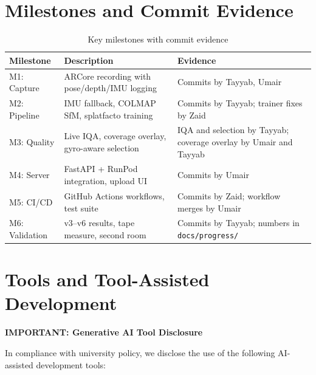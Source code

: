 \section{Milestones and Commit Evidence}

\begin{table}[htbp]
\centering
\small
\caption{Key milestones with commit evidence}
\label{tab:milestones}
\begin{tabular}{p{2.5cm}p{5cm}p{4cm}}
\toprule
\textbf{Milestone} & \textbf{Description} & \textbf{Evidence} \\
\midrule
M1: Capture & ARCore recording with pose/depth/IMU logging & Commits by Tayyab, Umair \\
M2: Pipeline & IMU fallback, COLMAP SfM, splatfacto training & Commits by Tayyab; trainer fixes by Zaid \\
M3: Quality & Live IQA, coverage overlay, gyro-aware selection & IQA and selection by Tayyab; coverage overlay by Umair and Tayyab \\
M4: Server & FastAPI + RunPod integration, upload UI & Commits by Umair \\
M5: CI/CD & GitHub Actions workflows, test suite & Commits by Zaid; workflow merges by Umair \\
M6: Validation & v3--v6 results, tape measure, second room & Commits by Tayyab; numbers in \texttt{docs/progress/} \\
\bottomrule
\end{tabular}
\end{table}

\section{Tools and Tool-Assisted Development}

\textbf{IMPORTANT: Generative AI Tool Disclosure}

In compliance with university policy, we disclose the use of the following AI-assisted development tools:

